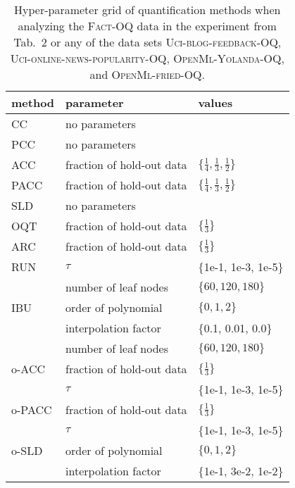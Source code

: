 \documentclass[10pt,a4paper]{article}
\begin{document}
\begin{table}
  \centering
  \caption{Hyper-parameter grid of quantification methods when analyzing the \textsc{Fact-OQ} data in the experiment from Tab.~2 or any of the data sets \textsc{Uci-blog-feedback-OQ}, \textsc{Uci-online-news-popularity-OQ}, \textsc{OpenMl-Yolanda-OQ}, and \textsc{OpenMl-fried-OQ}.}
  \label{tab:hyperparameter-fact-quantifier}
  \footnotesize
  \begin{tabular}{lll}
    \toprule
    method & parameter & values \\
    \midrule
    CC & no parameters & \\
    PCC & no parameters & \\
    ACC & fraction of hold-out data & $\{\frac{1}{4}, \frac{1}{3}, \frac{1}{2}\}$ \\
    PACC & fraction of hold-out data & $\{\frac{1}{4}, \frac{1}{3}, \frac{1}{2}\}$ \\
    SLD & no parameters & \\
    \midrule
    OQT & fraction of hold-out data & $\{\frac{1}{3}\}$ \\
    ARC & fraction of hold-out data & $\{\frac{1}{3}\}$ \\
    RUN & $\tau$ & $\{$1e-1, 1e-3, 1e-5$\}$ \\
        & number of leaf nodes & $\{60, 120, 180\}$ \\
    IBU & order of polynomial & $\{0, 1, 2\}$ \\
        & interpolation factor & $\{$0.1, 0.01, 0.0$\}$ \\
        & number of leaf nodes & $\{60, 120, 180\}$ \\
    \midrule
    o-ACC & fraction of hold-out data & $\{\frac{1}{3}\}$ \\
          & $\tau$ & $\{$1e-1, 1e-3, 1e-5$\}$ \\
    o-PACC & fraction of hold-out data & $\{\frac{1}{3}\}$ \\
           & $\tau$ & $\{$1e-1, 1e-3, 1e-5$\}$ \\
    o-SLD & order of polynomial & $\{0, 1, 2\}$ \\
        & interpolation factor & $\{$1e-1, 3e-2, 1e-2$\}$ \\
    \bottomrule
  \end{tabular}
\end{table}
\end{document}
